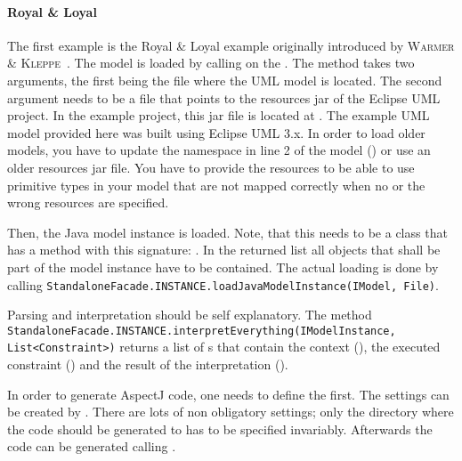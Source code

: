 \paragraph{Royal \& Loyal}
The first example is the Royal \& Loyal example originally introduced by
{\scshape Warmer \& Kleppe}~\cite{warmerEA:ocl03}. The model is loaded by
calling  on the
. The method takes two arguments, the first being
the file where the UML model is located. The second argument needs to be a file that
points to the resources jar of the Eclipse UML project. In the example project, 
this jar file is located at 
.
The example UML model provided here was built using Eclipse UML 3.x. In order to
load older models, you have to update the namespace in line 2 of the model 
() or use an older 
resources jar file. You have to provide the resources to be able to use
primitive types in your model that are not mapped correctly when no or the wrong
resources are specified.

Then, the Java model instance is loaded. Note, that this needs to be a class 
that has a method with this signature: . In the returned list all objects that shall be part of the 
model instance have to be contained. The actual loading is done by calling 
\lstinline[breaklines=true]{StandaloneFacade.INSTANCE.loadJavaModelInstance(IModel, File)}.

Parsing and interpretation should be self explanatory. The method 
\lstinline[breaklines=true]{StandaloneFacade.INSTANCE.interpretEverything(IModelInstance, List<Constraint>)} returns a list of
s that contain the context (), the executed constraint 
() and the result of the interpretation 
().

In order to generate AspectJ code, one needs to define the
 first. The settings can be created by 
. 
There are lots of non obligatory settings; only the directory where the code 
should be generated to has to be specified invariably. Afterwards the code can 
be generated calling 
. 

